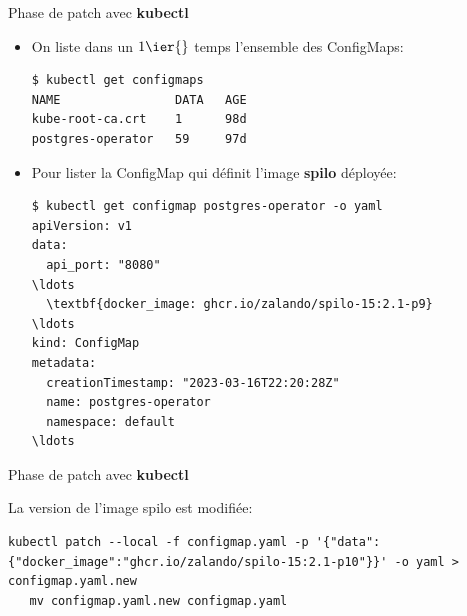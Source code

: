 \begin{frame}[fragile]{Phase de patch avec \textbf{kubectl}}

\begin{itemize}
   \item On liste dans un $1\ier{}$ temps l'ensemble des ConfigMaps:
      \begin{tiny}
      \begin{Verbatim}[commandchars=\&\{\}]
$ kubectl get configmaps
NAME                DATA   AGE
kube-root-ca.crt    1      98d
postgres-operator   59     97d
      \end{Verbatim}
      \end{tiny}

   \item Pour lister la ConfigMap qui définit l'image \textbf{spilo} déployée:
\begin{tiny}
\begin{Verbatim}[commandchars=\\\{\}]
$ kubectl get configmap postgres-operator -o yaml
apiVersion: v1               
data:               
  api_port: "8080"     
\ldots
  \textbf{docker_image: ghcr.io/zalando/spilo-15:2.1-p9}
\ldots
kind: ConfigMap
metadata:
  creationTimestamp: "2023-03-16T22:20:28Z"
  name: postgres-operator
  namespace: default
\ldots
\end{Verbatim}
\end{tiny}
\end{itemize}

\end{frame}


\begin{frame}[fragile]{Phase de patch avec \textbf{kubectl}}

   La version de l'image spilo est modifiée:
\begin{itemize}
\begin{tiny}
\begin{Verbatim}[commandchars=\\\{\}]
   kubectl patch --local -f configmap.yaml -p '{"data":{"docker_image":"ghcr.io/zalando/spilo-15:2.1-p10"}}' -o yaml > configmap.yaml.new
   mv configmap.yaml.new configmap.yaml
\end{Verbatim}
\end{tiny}
\end{itemize}

\end{frame}


